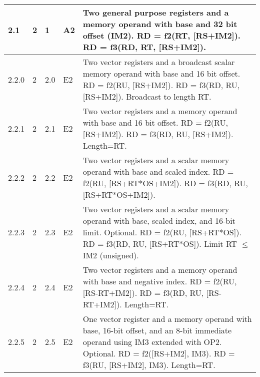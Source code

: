 \documentclass[forwardcom.tex]{subfiles}
\begin{document}
\begin{longtable} {|p{10mm}|p{6mm}|p{9mm}|p{7mm}|p{80mm}|}
\hline
2.1 & 2 & 1 & A2 & Two general purpose registers and a memory operand with base and 32 bit offset (IM2). \newline 
RD = f2(RT, [RS+IM2]). \newline 
RD = f3(RD, RT, [RS+IM2]).\\

\hline
2.2.0 & 2 & 2.0 & E2 & Two vector registers and a broadcast scalar memory operand with base  and 16 bit offset.\newline 
RD = f2(RU, [RS+IM2]). \newline 
RD = f3(RD, RU, [RS+IM2]). \newline
Broadcast to length RT.\\

\hline
2.2.1 & 2 & 2.1 & E2 & Two vector registers and a memory operand with base and 16 bit offset.\newline 
RD = f2(RU, [RS+IM2]). \newline 
RD = f3(RD, RU, [RS+IM2]).\newline
Length=RT.\\

\hline
2.2.2 & 2 & 2.2 & E2 & Two vector registers and a scalar memory operand with base and scaled index. \newline 
RD = f2(RU, [RS+RT*OS+IM2]). \newline 
RD = f3(RD, RU, [RS+RT*OS+IM2]). \\

\hline
2.2.3 & 2 & 2.3 & E2 & Two vector registers and a scalar memory operand with base, scaled index, and 16-bit limit. Optional. \newline 
RD = f2(RU, [RS+RT*OS]). \newline 
RD = f3(RD, RU, [RS+RT*OS]).\newline
Limit RT $\leq$ IM2 (unsigned).\\

\hline
2.2.4 & 2 & 2.4 & E2 & Two vector registers and a memory operand with base and negative index. \newline 
RD = f2(RU, [RS-RT+IM2]). \newline 
RD = f3(RD, RU, [RS-RT+IM2]). \newline 
Length=RT. \\

\hline
2.2.5 & 2 & 2.5  & E2 & One vector register and a memory operand with base, 16-bit offset, and an 8-bit immediate operand using IM3 extended with OP2. Optional. \newline 
RD = f2([RS+IM2], IM3). \newline 
RD = f3(RU, [RS+IM2], IM3). \newline 
Length=RT.\\


\end{longtable}
\end{document}
